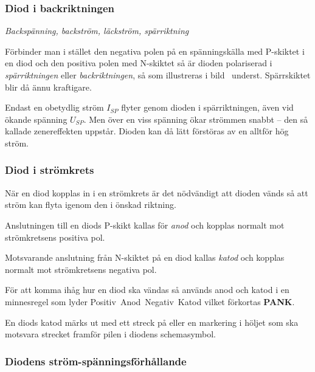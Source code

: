 \subsubsection{Diod i backriktningen}

\emph{Backspänning, backström, läckström, spärriktning}

Förbinder man i stället den negativa polen på en spänningskälla med P-skiktet i
en diod och den positiva polen med N-skiktet så är dioden polariserad i
\emph{spärriktningen} eller \emph{backriktningen}, så som illustreras i
bild~ underst.
Spärrskiktet blir då ännu kraftigare.

Endast en obetydlig ström \(I_{SP}\) flyter genom dioden i spärriktningen, även
vid ökande spänning \(U_{SP}\).
Men över en viss spänning ökar strömmen snabbt -- den så kallade zenereffekten
uppstår.
Dioden kan då lätt förstöras av en alltför hög ström.

\subsubsection{Diod i strömkrets}

När en diod kopplas in i en strömkrets är det nödvändigt att dioden vänds så att
ström kan flyta igenom den i önskad riktning.

Anslutningen till en diods P-skikt kallas för \emph{anod} och kopplas normalt
mot strömkretsens positiva pol.

Motsvarande anslutning från N-skiktet på en diod kallas \emph{katod} och kopplas
normalt mot strömkretsens negativa pol.

För att komma ihåg hur en diod ska vändas så används anod och katod i en
minnesregel som lyder Positiv~Anod~Negativ~Katod vilket förkortas \textbf{PANK}.

En diods katod märks ut med ett streck på eller en markering i höljet som ska
motsvara strecket framför pilen i diodens schemasymbol.

\subsubsection{Diodens ström-spänningsförhållande}


